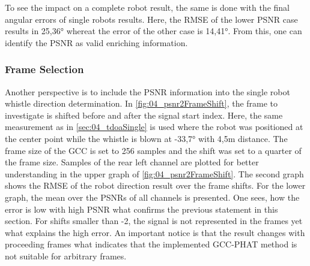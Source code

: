 To see the impact on a complete robot result, the same is done
with the final angular errors of single robots results.
Here, the \ac{RMSE} of the lower \ac{PSNR} case results in 25,36\si{\degree}
whereat the error of the other case is 14,41\si{\degree}.
From this, one can identify the \ac{PSNR} as valid enriching information.

\subsubsection*{Frame Selection}

Another perspective is to include the PSNR information into the single
robot whistle direction determination.
In \cref{fig:04_psnr2FrameShift}, the frame to investigate is
shifted before and after the signal start index.
Here, the same measurement as in \cref{sec:04_tdoaSingle} is used where
the robot was positioned at the center point
while the whistle is blown at -33,7\si{\degree} with 4,5\si{\meter}
distance.
The frame size of the \ac{GCC} is set to 256 samples and the shift
was set to a quarter of the frame size.
Samples of the rear left channel are plotted for better understanding
in the upper graph of \cref{fig:04_psnr2FrameShift}.
The second graph shows the \ac{RMSE} of the robot direction result
over the frame shifts.
For the lower graph, the mean over the \acp{PSNR} of all channels
is presented.
One sees, how the error is low with high \ac{PSNR} what confirms
the previous statement in this section.
For shifts smaller than -2, the signal is not represented in the
frames yet what explains the high error.
An important notice is that the result changes with proceeding
frames what indicates that the implemented \ac{GCC-PHAT} method is
not suitable for arbitrary frames.

